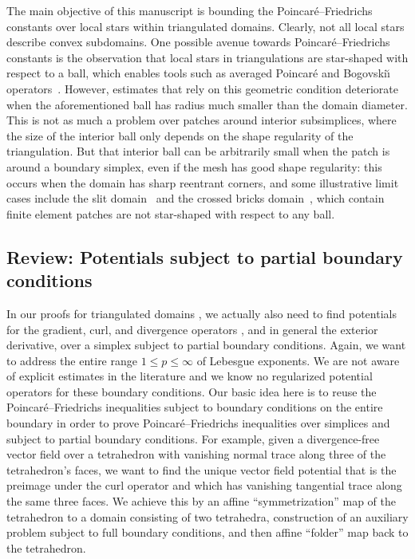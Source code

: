 \documentclass[10pt,a4paper]{article}
\newcommand\cye[1]{%
\protect\leavevmode
\begingroup
    \color{blue}%
    #1%
\endgroup
}
\begin{document}
The main objective of this manuscript is bounding the Poincar\'e--Friedrichs constants over local stars within triangulated domains. 
Clearly, not all local stars describe convex subdomains. 
One possible avenue towards Poincar\'e--Friedrichs constants is the observation that local stars in triangulations are star-shaped with respect to a ball,
which enables tools such as averaged Poincar\'e and Bogovski\u{\i} operators~\cite{costabel2010bogovskiui}. 
However, estimates that rely on this geometric condition deteriorate when the aforementioned ball has radius much smaller than the domain diameter. 
This is not as much a problem over patches around interior subsimplices, where the size of the interior ball only depends on the shape regularity of the triangulation. 
But that interior ball can be arbitrarily small when the patch is around a boundary simplex, even if the mesh has good shape regularity: 
this occurs when the domain has sharp reentrant corners, and some illustrative limit cases include the slit domain~\cite{veeser2012poincare} and the crossed bricks domain~\cite{licht2019smoothed}, %
which contain finite element patches are not star-shaped with respect to any ball. 


\subsection{Review: Potentials subject to partial boundary conditions}

\cye{In our proofs for triangulated domains}, we \cye{actually also} need to find potentials for the gradient, curl, and divergence operators\cye{, and in general the exterior derivative,} over a simplex subject to partial boundary conditions. 
Again, we want to address the entire range $1 \leq p \leq \infty$ of Lebesgue exponents. 
We are not aware of explicit estimates in the literature and \cye{we know} no regularized potential operators for these boundary conditions. 
\cye{Our basic idea here is to reuse} the Poincar\'e--Friedrichs inequalities subject to boundary conditions \cye{on the entire boundary in order} to prove Poincar\'e--Friedrichs inequalities over simplices and subject to partial boundary conditions. 
For example, given a divergence-free vector field over a tetrahedron with vanishing normal trace along three of the tetrahedron's faces, we want to find the unique vector field potential that is the preimage under the curl operator and which has vanishing tangential trace along the same three faces. We achieve this by \cye{an affine ``symmetrization'' map of the tetrahedron to a domain consisting of two tetrahedra,} construction of an auxiliary problem subject to full boundary conditions, and then affine ``folder'' map back to the tetrahedron.
\\
\end{document}
